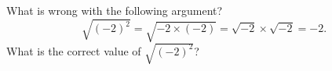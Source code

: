 What is wrong with the following argument?
\[\sqrt{(-2)^2}=\sqrt{-2\times(-2)}=\sqrt{-2}\times\sqrt{-2}=-2.\]
What is the correct value of $\sqrt{(-2)^2}$?
